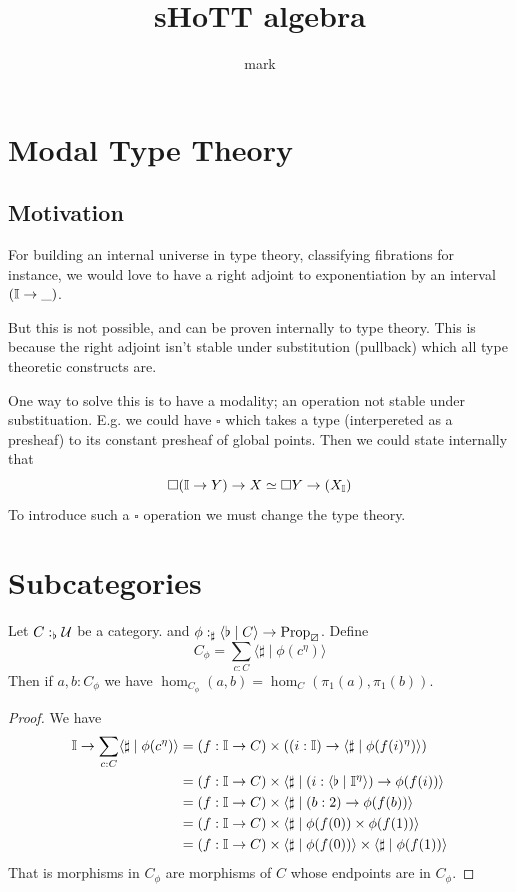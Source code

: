 \documentclass{article}
\title{sHoTT algebra}
\author{mark}
\begin{document}
\maketitle

\section{Modal Type Theory}

\subsection{Motivation}

For building an internal universe in type theory, classifying fibrations for instance,
we would love to have a right adjoint to exponentiation by an interval $(\mathbb{I} \to \_)$.

But this is not possible, and can be proven internally to type theory.
This is because the right adjoint isn't stable under substitution (pullback) which all type theoretic constructs are.

One way to solve this is to have a modality; an operation not stable under substituation. 
E.g. we could have $\square$ which takes a type (interpereted as a presheaf) to its constant presheaf of global points.
Then we could state internally that
\[ \square (\mathbb{I} \to Y) \to X \simeq \square Y \to (X_{\mathbb{I}}) \]
To introduce such a $\square$ operation we must change the type theory.

\section{Subcategories}

\begin{theorem}
  Let $C :_\flat \mathcal{U}$ be a category.
  and $\phi :_\sharp \langle \flat \mid C \rangle \to \mathrm{Prop}_{\boxslash}$.
  Define 
  \[ C_\phi = \sum_{c : C} \langle \sharp \mid \phi(c^\eta) \rangle \]  
  Then if $a, b : C_\phi$ we have $\hom_{C_\phi}(a, b) = \hom_{C}(\pi_1(a), \pi_1(b))$.

\end{theorem}
\begin{proof}
  We have 
  \begin{align*}
    \mathbb{I} \to \sum_{c : C} \langle \sharp \mid \phi(c^\eta) \rangle
    &= (f : \mathbb{I} \to C) \times ((i : \mathbb{I}) \to \langle \sharp \mid \phi(f(i)^\eta) \rangle) \\
    &= (f : \mathbb{I} \to C) \times \langle \sharp \mid (i : \langle \flat \mid \mathbb{I}^{\eta} \rangle) \to \phi(f(i))  \rangle \\
    &= (f : \mathbb{I} \to C) \times \langle \sharp \mid (b : 2) \to \phi(f(b)) \rangle \\
    &= (f : \mathbb{I} \to C) \times \langle \sharp \mid \phi(f(0)) \times \phi(f(1)) \rangle \\
    &= (f : \mathbb{I} \to C) \times \langle \sharp \mid \phi(f(0)) \rangle \times \langle \sharp \mid \phi(f(1)) \rangle 
  \end{align*}
  That is morphisms in $C_\phi$ are morphisms of $C$ whose endpoints are in $C_\phi$.
\end{proof}
\end{document}
